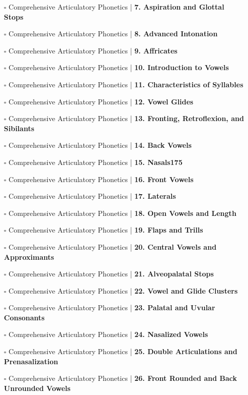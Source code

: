 \documentclass[a4, landscape, 12pt]{article}
\newcommand{\checkbox}{$\square$}%
\begin{document}
\begin{itemize}
{}
\item [\checkbox]  Comprehensive Articulatory Phonetics | \textbf{ 7. Aspiration and Glottal Stops
}
\item [\checkbox]  Comprehensive Articulatory Phonetics | \textbf{ 8. Advanced Intonation
}
\item [\checkbox]  Comprehensive Articulatory Phonetics | \textbf{ 9. Affricates
}
\item [\checkbox]  Comprehensive Articulatory Phonetics | \textbf{ 10. Introduction to Vowels
}
\item [\checkbox]  Comprehensive Articulatory Phonetics | \textbf{ 11. Characteristics of Syllables
}
\item [\checkbox]  Comprehensive Articulatory Phonetics | \textbf{ 12. Vowel Glides
}
\item [\checkbox]  Comprehensive Articulatory Phonetics | \textbf{ 13. Fronting, Retroflexion, and Sibilants
}
\item [\checkbox]  Comprehensive Articulatory Phonetics | \textbf{ 14. Back Vowels
}
\item [\checkbox]  Comprehensive Articulatory Phonetics | \textbf{ 15. Nasals175
}
\item [\checkbox]  Comprehensive Articulatory Phonetics | \textbf{ 16. Front Vowels
}
\item [\checkbox]  Comprehensive Articulatory Phonetics | \textbf{ 17. Laterals
}
\item [\checkbox]  Comprehensive Articulatory Phonetics | \textbf{ 18. Open Vowels and Length
}
\item [\checkbox]  Comprehensive Articulatory Phonetics | \textbf{ 19. Flaps and Trills
}
\item [\checkbox]  Comprehensive Articulatory Phonetics | \textbf{ 20. Central Vowels and Approximants
}
\item [\checkbox]  Comprehensive Articulatory Phonetics | \textbf{ 21. Alveopalatal Stops
}
\item [\checkbox]  Comprehensive Articulatory Phonetics | \textbf{ 22. Vowel and Glide Clusters
}
\item [\checkbox]  Comprehensive Articulatory Phonetics | \textbf{ 23. Palatal and Uvular Consonants
}
\item [\checkbox]  Comprehensive Articulatory Phonetics | \textbf{ 24. Nasalized Vowels
}
\item [\checkbox]  Comprehensive Articulatory Phonetics | \textbf{ 25. Double Articulations and Prenasalization
}
\item [\checkbox]  Comprehensive Articulatory Phonetics | \textbf{ 26. Front Rounded and Back Unrounded Vowels
}
\end{itemize}
\end{document}

